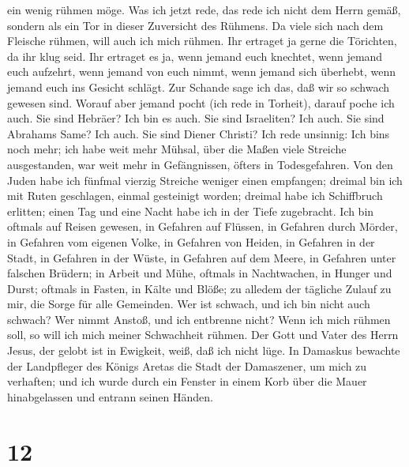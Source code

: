 ein wenig rühmen möge.  Was ich jetzt rede, das rede ich
nicht dem Herrn gemäß, sondern als ein Tor in dieser Zuversicht des
Rühmens.  Da viele sich nach dem Fleische rühmen, will
auch ich mich rühmen.  Ihr ertraget ja gerne die
Törichten, da ihr klug seid.  Ihr ertraget es ja, wenn
jemand euch knechtet, wenn jemand euch aufzehrt, wenn jemand von euch
nimmt, wenn jemand sich überhebt, wenn jemand euch ins Gesicht schlägt.
 Zur Schande sage ich das, daß wir so schwach gewesen
sind. Worauf aber jemand pocht (ich rede in Torheit), darauf poche ich
auch.  Sie sind Hebräer? Ich bin es auch. Sie sind
Israeliten? Ich auch. Sie sind Abrahams Same? Ich auch. 
Sie sind Diener Christi? Ich rede unsinnig: Ich bin\textquotesingle s
noch mehr; ich habe weit mehr Mühsal, über die Maßen viele Streiche
ausgestanden, war weit mehr in Gefängnissen, öfters in Todesgefahren.
 Von den Juden habe ich fünfmal vierzig Streiche weniger
einen empfangen;  dreimal bin ich mit Ruten geschlagen,
einmal gesteinigt worden; dreimal habe ich Schiffbruch erlitten; einen
Tag und eine Nacht habe ich in der Tiefe zugebracht.  Ich
bin oftmals auf Reisen gewesen, in Gefahren auf Flüssen, in Gefahren
durch Mörder, in Gefahren vom eigenen Volke, in Gefahren von Heiden, in
Gefahren in der Stadt, in Gefahren in der Wüste, in Gefahren auf dem
Meere, in Gefahren unter falschen Brüdern;  in Arbeit und
Mühe, oftmals in Nachtwachen, in Hunger und Durst; oftmals in Fasten, in
Kälte und Blöße;  zu alledem der tägliche Zulauf zu mir,
die Sorge für alle Gemeinden.  Wer ist schwach, und ich
bin nicht auch schwach? Wer nimmt Anstoß, und ich entbrenne nicht?
 Wenn ich mich rühmen soll, so will ich mich meiner
Schwachheit rühmen.  Der Gott und Vater des Herrn Jesus,
der gelobt ist in Ewigkeit, weiß, daß ich nicht lüge.  In
Damaskus bewachte der Landpfleger des Königs Aretas die Stadt der
Damaszener, um mich zu verhaften;  und ich wurde durch
ein Fenster in einem Korb über die Mauer hinabgelassen und entrann
seinen Händen.

\hypertarget{section-11}{%
\section{12}\label{section-11}}

